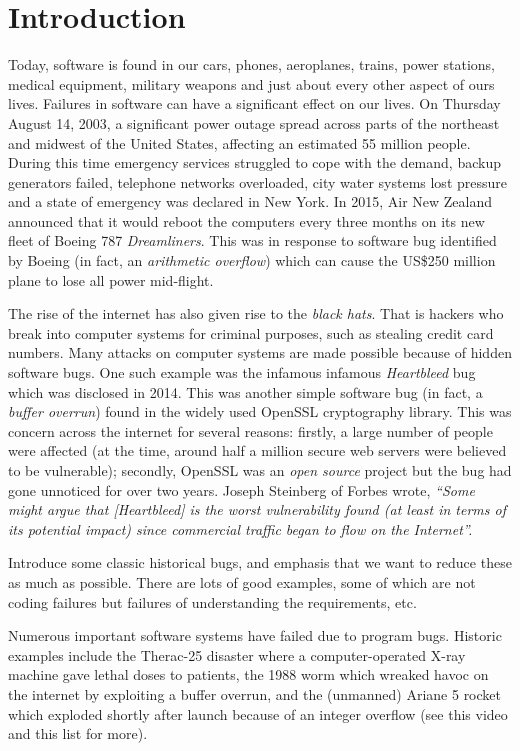 \chapter{Introduction}

Today, software is found in our cars, phones, aeroplanes, trains, power stations, medical equipment, military weapons and just about every other aspect of ours lives.  Failures in software can have a significant effect on our lives.  On Thursday August 14, 2003, a significant power outage spread across parts of the northeast and midwest of the United States, affecting an estimated 55 million people.  During this time emergency services struggled to cope with the demand, backup generators failed, telephone networks overloaded, city water systems lost pressure and a state of emergency was declared in New York.  In 2015, Air New Zealand announced that it would reboot the computers every three months on its new fleet of Boeing 787 {\em Dreamliners}.  This was in response to software bug identified by Boeing (in fact, an {\em arithmetic overflow}) which can cause the US\$250 million plane to lose all power mid-flight. 

The rise of the internet has also given rise to the {\em black hats}.  That is hackers who break into computer systems for criminal purposes, such as stealing credit card numbers.  Many attacks on computer systems are made possible because of hidden software bugs.  One such example was the infamous infamous {\em Heartbleed} bug which was disclosed in 2014.  This was another simple software bug (in fact, a {\em buffer overrun}) found in the widely used OpenSSL cryptography library.   This was concern across the internet for several reasons:  firstly, a large number of people were affected (at the time, around half a million secure web servers were believed to be vulnerable); secondly, OpenSSL was an {\em open source} project but the bug had gone unnoticed for over two years. Joseph Steinberg of Forbes wrote, {\em ``Some might argue that [Heartbleed] is the worst vulnerability found (at least in terms of its potential impact) since commercial traffic began to flow on the Internet''.}


Introduce some classic historical bugs, and emphasis that we want to reduce these as much as possible.  There are lots of good examples, some of which are not coding failures but failures of understanding the requirements, etc.

Numerous important software systems have failed due to program bugs. Historic examples include the Therac-25 disaster where a computer-operated X-ray machine gave lethal doses to patients, the 1988 worm which wreaked havoc on the internet by exploiting a buffer overrun, and the (unmanned) Ariane 5 rocket which exploded shortly after launch because of an integer overflow (see this video and this list for more).


